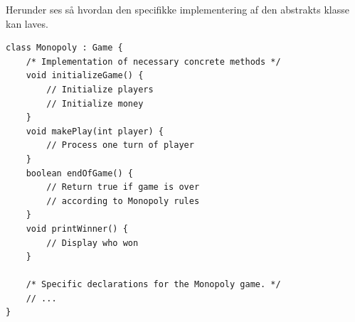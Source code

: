 Herunder ses så hvordan den specifikke implementering af den abstrakts klasse kan laves.

\begin{lstlisting}
class Monopoly : Game {
	/* Implementation of necessary concrete methods */
	void initializeGame() {
		// Initialize players
		// Initialize money
	}
	void makePlay(int player) {
		// Process one turn of player
	}
	boolean endOfGame() {
		// Return true if game is over 
		// according to Monopoly rules
	}
	void printWinner() {
		// Display who won
	}
	
	/* Specific declarations for the Monopoly game. */
	// ...
}
\end{lstlisting}





